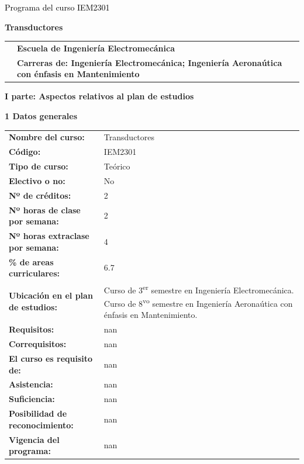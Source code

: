 \documentclass[letterpaper]{article}%
\begin{document}
%
\normalsize%
\thispagestyle{empty}%
%
\vspace*{150mm}%
\par\fontsize{14}{0}\selectfont \textcolor{black}{Programa del curso IEM2301}%
\par\fontsize{18}{25}\selectfont \textbf{\textcolor{azulsuaveTEC}{Transductores}}%
\renewcommand{\arraystretch}{0.7}%
\begin{longtable}{|m{}|m{}|}%
&\hspace*{0mm}\fontsize{12}{14}\selectfont \textbf{\textcolor{gris}{Escuela de Ingeniería Electromecánica}}\\%
&\hspace*{0mm}\fontsize{12}{14}\selectfont \textbf{\textcolor{gris}{Carreras de:  Ingeniería Electromecánica; Ingeniería Aeronaútica con énfasis en Mantenimiento}}\\%
\end{longtable}%
\newpage%
\pagestyle{headfoot}%
\par\fontsize{14}{0}\selectfont \textbf{\textcolor{parte}{I parte: Aspectos relativos al plan de estudios}}%
\par\hspace*{4mm}\fontsize{12}{20}\selectfont \textbf{\textcolor{parte}{1 Datos generales}}%
\renewcommand{\arraystretch}{1.5}%
\begin{longtable}{m{7cm}m{9cm}}%
\textbf{Nombre del curso:}&Transductores\\%
\textbf{Código:}&IEM2301\\%
\textbf{Tipo de curso:}&Teórico\\%
\textbf{Electivo o no:}&No\\%
\textbf{Nº de créditos:}&2\\%
\textbf{Nº horas de clase por semana:}&2\\%
\textbf{Nº horas extraclase por semana:}&4\\%
\textbf{\% de areas curriculares:}&6.7\\%
\textbf{Ubicación en el plan de estudios:}&Curso de 3\textsuperscript{er} semestre en  Ingeniería Electromecánica. Curso de 8\textsuperscript{vo} semestre en Ingeniería Aeronaútica con énfasis en Mantenimiento. \\%
\textbf{Requisitos:}&nan\\%
\textbf{Correquisitos:}&nan\\%
\textbf{El curso es requisito de:}&nan\\%
\textbf{Asistencia:}&nan\\%
\textbf{Suficiencia:}&nan\\%
\textbf{Posibilidad de reconocimiento:}&nan\\%
\textbf{Vigencia del programa:}&nan\\%
\end{longtable}%
\end{document}
